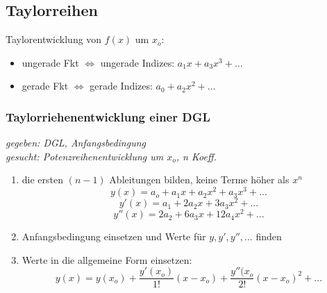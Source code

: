 \subsection{Taylorreihen}
    Taylorentwicklung von $f(x)$ um $x_o$:
    \begin{itemize}
    \item ungerade Fkt $\Leftrightarrow$ ungerade Indizes: $a_1x + a_3x^3 + \dots$
    \item gerade Fkt $\Leftrightarrow$ gerade Indizes: $a_0 + a_2x^2 + \dots$
    \end{itemize}
    
    \vspace{3pt}
    
    \subsubsection{Taylorriehenentwicklung einer DGL}
    \vspace{3pt}
     \vspace{3pt}
    
    \textit{gegeben: DGL, Anfangsbedingung \\ gesucht: Potenzreihenentwicklung um $x_o$, n Koeff. }
    \begin{enumerate}
        \item die ersten $(n-1)$ Ableitungen bilden, keine Terme höher als $x^n$ 
        $$y(x) = a_o + a_1x + a_2x^2 + a_3x^3 + ... $$
        $$y'(x) = a_1 + 2a_2x + 3a_3x^2 + ... $$
        $$ y''(x) = 2a_2 +  6 a_3x + 12a_4x^2 + ...$$
        \item Anfangsbedingung einsetzen und Werte für $y, y', y'', ...$ finden 
        \item Werte in die allgemeine Form einsetzen: 
        $$y(x) = y(x_o) + \frac{y'(x_o)}{1!}(x-x_o) + \frac{y''(x_o}{2!}(x-x_o)^2 + ... $$
    \end{enumerate}